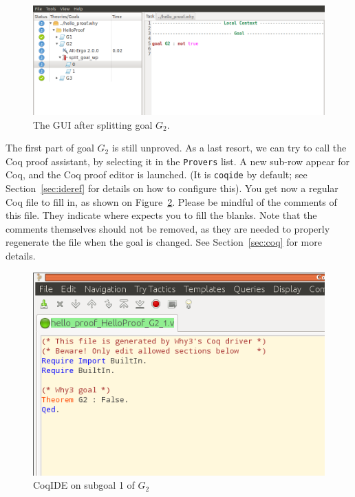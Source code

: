 \begin{figure}[tbp]
 \includegraphics[width=\textwidth]{gui-4.png}
  \caption{The GUI after splitting goal $G_2$.}
  \label{fig:gui4}
\end{figure}

The first part of goal $G_2$ is still unproved. As a last resort, we
can try to call the Coq proof assistant, by selecting it in the
\texttt{Provers} list.
A new sub-row appear for Coq, and the Coq proof editor is launched.
(It is \texttt{coqide} by default; see
Section~\ref{sec:ideref} for details on how to configure this). You get
now a regular Coq file to fill in, as shown on Figure~\ref{fig:coqide}.
Please be mindful of the comments of this file. They indicate where \why
expects you to fill the blanks. Note that the comments themselves should
not be removed, as they are needed to properly regenerate the file when the
goal is changed. See Section~\ref{sec:coq} for more details.

\begin{figure}[tbp]
  \includegraphics[width=\textwidth]{coqide-0-81.png}
  \caption{CoqIDE on subgoal 1 of $G_2$}
  \label{fig:coqide}
\end{figure}

